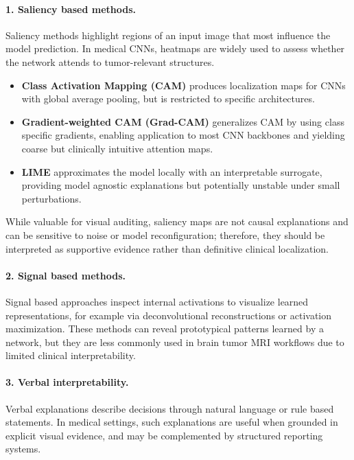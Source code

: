 \paragraph{1. Saliency based methods.}
Saliency methods highlight regions of an input image that most influence the model prediction. In medical CNNs, heatmaps are widely used to assess whether the network attends to tumor-relevant structures.
\begin{itemize}
    \item \textbf{Class Activation Mapping (CAM)} produces localization maps for CNNs with global average pooling, but is restricted to specific architectures.
    \item \textbf{Gradient-weighted CAM (Grad-CAM)} generalizes CAM by using class specific gradients, enabling application to most CNN backbones and yielding coarse but clinically intuitive attention maps.
    \item \textbf{LIME} approximates the model locally with an interpretable surrogate, providing model agnostic explanations but potentially unstable under small perturbations.
\end{itemize}
While valuable for visual auditing, saliency maps are not causal explanations and can be sensitive to noise or model reconfiguration; therefore, they should be interpreted as supportive evidence rather than definitive clinical localization.

\paragraph{2. Signal based methods.}
Signal based approaches inspect internal activations to visualize learned representations, for example via deconvolutional reconstructions or activation maximization. These methods can reveal prototypical patterns learned by a network, but they are less commonly used in brain tumor MRI workflows due to limited clinical interpretability.

\paragraph{3. Verbal interpretability.}
Verbal explanations describe decisions through natural language or rule based statements. In medical settings, such explanations are useful when grounded in explicit visual evidence, and may be complemented by structured reporting systems.





